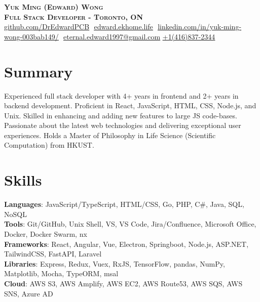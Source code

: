 \documentclass[letterpaper,11pt]{article}
\begin{document}

\vspace*{-7pt}

\begin{center}
    \textbf{\Huge \scshape Yuk Ming (Edward) Wong} \\ \vspace{8pt}
      \textbf{\small \scshape Full Stack Developer - Toronto, ON} \\ \vspace{8pt}
    \small 
    \href{https://github.com/DrEdwardPCB}{\underline{github.com/DrEdwardPCB}} $  $
    \href{https://edward.ekhome.life}
    {\underline{edward.ekhome.life}} $  $
    \href{https://www.linkedin.com/in/yuk-ming-wong-003bab149/}{\underline{linkedin.com/in/yuk-ming-wong-003bab149/}} $  $\newline
    \href{mailto:eternal.edward1997@gmail.com}
    {\underline{eternal.edward1997@gmail.com}}$  $
    \href{tel:+14168372344}
    {\underline{+1(416)837-2344}}
\end{center}
\section{Summary}
  {\small{Experienced full stack developer with 4+ years in frontend and 2+ years in backend development. Proficient in React, JavaScript, HTML, CSS, Node.js, and Unix. Skilled in enhancing and adding new features to large JS code-bases. Passionate about the latest web technologies and delivering exceptional user experiences. Holds a Master of Philosophy in Life Science (Scientific Computation) from HKUST.}}
  
\section{Skills}
 \begin{itemize}[leftmargin=0.15in, label={}]
    \small{\item{
    
     \textbf{Languages}{: JavaScript/TypeScript, HTML/CSS, Go, PHP, C\#, Java, SQL, NoSQL} \\
     
     \textbf{Tools}{: Git/GitHub, Unix Shell, VS, VS Code, Jira/Confluence, Microsoft Office, Docker, Docker Swarm, nx }\\
     
    \textbf{Frameworks}{: React, Angular, Vue, Electron, Springboot, Node.js, ASP.NET, TailwindCSS, FastAPI, Laravel}\\
    \textbf{Libraries}{: Express, Redux, Vuex, RxJS, TensorFlow, pandas, NumPy, Matplotlib, Mocha, TypeORM, msal}\\
    \textbf{Cloud}{: AWS S3, AWS Amplify, AWS EC2, AWS Route53, AWS SQS, AWS SNS, Azure AD}
     
    }}
 \end{itemize}
 
\end{document}
